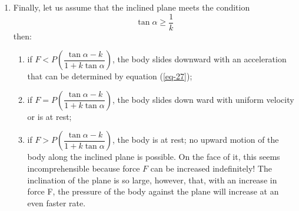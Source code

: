 \documentclass[a4paper,sfsidenotes]{tufte-book}
\begin{document}
\begin{enumerate}[label=\textbf{(\arabic*)},leftmargin=1cm]
\item Finally, let us assume that the inclined plane meets the condition 
\begin{equation*}
\tan \alpha \geqslant \frac{1}{k}
\end{equation*}
then:
\begin{enumerate}[label=\textbf{(\alph*)},leftmargin=1cm]
\item if $F< P \left(\dfrac{\tan \alpha - k}{ 1 + k \tan \alpha}\right)$, the body slides downward with an acceleration that can be determined by equation (\ref{eq-27});
\item if $F = P \left(\dfrac{\tan \alpha - k}{ 1 + k \tan \alpha}\right)$, the body slides down ward with uniform velocity or is at rest;
\item if $F > P \left(\dfrac{\tan \alpha - k}{ 1 + k \tan \alpha}\right)$, the body is at rest; no upward motion of the body along the inclined plane is possible. On the face of it, this seems incomprehensible because force $F$ can be increased indefinitely! The inclination of the plane is so large, however, that, with an increase in force F, the pressure of the body against the plane will increase at an even faster rate.
\end{enumerate}
\end{enumerate}
\end{document}
